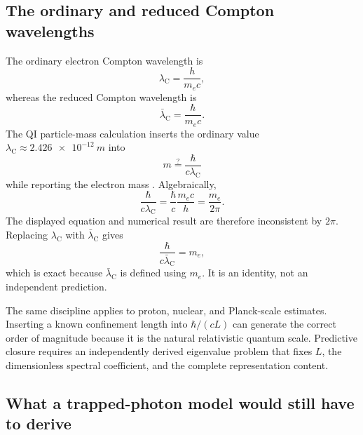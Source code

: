 \documentclass[11pt]{article}
\begin{document}
\subsection{The ordinary and reduced Compton wavelengths}

The ordinary electron Compton wavelength is
\begin{equation}
    \lambda_{\mathrm C}=\frac{h}{m_{e}c},
\end{equation}
whereas the reduced Compton wavelength is
\begin{equation}
    \bar\lambda_{\mathrm C}=\frac{\hbar}{m_{e}c}.
\end{equation}
The QI particle-mass calculation inserts the ordinary value \(\lambda_{\mathrm C}\approx\SI{2.426e-12}{m}\) into
\begin{equation}
    m\stackrel{?}{=}\frac{\hbar}{c\lambda_{\mathrm C}}
\end{equation}
while reporting the electron mass \cite{McCulloch2016,Tiesinga2021}. Algebraically,
\begin{equation}
    \frac{\hbar}{c\lambda_{\mathrm C}}
    =\frac{\hbar}{c}\frac{m_{e}c}{h}
    =\frac{m_{e}}{2\pi}.
    \label{eq:compton_2pi}
\end{equation}
The displayed equation and numerical result are therefore inconsistent by \(2\pi\). Replacing \(\lambda_{\mathrm C}\) with \(\bar\lambda_{\mathrm C}\) gives
\begin{equation}
    \frac{\hbar}{c\bar\lambda_{\mathrm C}}=m_{e},
\end{equation}
which is exact because \(\bar\lambda_{\mathrm C}\) is defined using \(m_{e}\). It is an identity, not an independent prediction.

The same discipline applies to proton, nuclear, and Planck-scale estimates. Inserting a known confinement length into \(\hbar/(cL)\) can generate the correct order of magnitude because it is the natural relativistic quantum scale. Predictive closure requires an independently derived eigenvalue problem that fixes \(L\), the dimensionless spectral coefficient, and the complete representation content.

\subsection{What a trapped-photon model would still have to derive}
\end{document}
